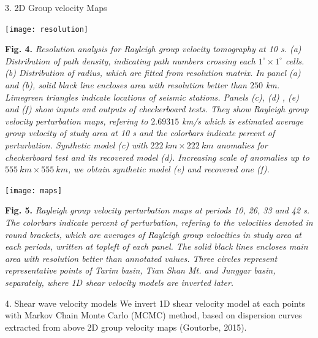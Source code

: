 \documentclass[
    landscape,      %
    paperwidth = 1200mm,
    paperheight = 900mm,
    fontscale = 0.4,
    margin = 1.7cm,
]{baposter}
\begin{document}
\begin{poster}
\begin{posterbox}[column=1]{3. 2D Group velocity Maps}
\begin{center}
\texttt{[image: resolution]}
\begin{minipage}{0.9\textwidth}
\footnotesize
\vspace{0.2em}
\textbf{Fig. 4.}
\itshape
Resolution analysis for Rayleigh group velocity tomography at 10 s. (a) Distribution
of path density, indicating path numbers crossing each $1^{\circ} \times 1^{\circ}$ cells.
(b) Distribution of radius, which are fitted from resolution matrix.  In panel (a) and (b),
solid black line encloses area with resolution better than $250$ km.  Limegreen triangles
indicate locations of seismic stations. Panels (c), (d) , (e) and (f) show inputs and outputs of checkerboard tests.
They show Rayleigh group velocity perturbation maps, refering to $2.69315$ km/s which is estimated average group velocity
of study area at 10 s and the colorbars indicate percent of perturbation.
Synthetic model (c) with $222 \ \textit{km} \times 222 \ \textit{km}$ anomalies for checkerboard test and its recovered model (d).
Increasing scale of anomalies up to $555 \ \textit{km} \times 555 \ \textit{km}$, we obtain synthetic model (e) and
recovered one (f).
\end{minipage}
\end{center}

\begin{center}
\texttt{[image: maps]}
\begin{minipage}{0.9\textwidth}
\footnotesize
\vspace{0.2em}
\textbf{Fig. 5.}
\itshape
Rayleigh group velocity perturbation maps at periods
10, 26, 33 and 42 s. The colorbars indicate percent of perturbation, refering to the velocities
denoted in round brackets, which are averages of Rayleigh group velocities in study area at each periods, written
at topleft of each panel. The solid black lines encloses main area with resolution better than
annotated values. Three circles represent representative points of Tarim basin, Tian Shan Mt.
and Junggar basin, separately, where 1D shear velocity models are inverted later.
\end{minipage}
\end{center}

\end{posterbox}

\begin{posterbox}[column=2 ]{4. Shear wave velocity models}
We invert 1D shear velocity model at each points with Markov Chain Monte
Carlo (MCMC) method, based on dispersion curves extracted from above 2D group velocity
maps (Goutorbe, 2015).


\end{posterbox}
\end{poster}
\end{document}
